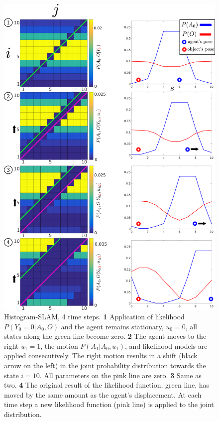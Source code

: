 \begin{figure}
 \centering
  \includegraphics[width=\textwidth]{./ch5-MLMF/Figures/explenation/hist_motion.pdf}
  \caption{Histogram-SLAM, 4 time steps. \textbf{1} Application of likelihood $P(Y_0=0|A_0,O)$ and the agent remains stationary, $u_0=0$, all states along the green line become zero.
  \textbf{2} The agent moves to the right $u_1=1$, the motion $P(A_1|A_0,u_1)$, and likelihood models are applied consecutively. The right motion results in a shift (black arrow on the left) in the joint probability 
  distribution towards the state $i=10$. All parameters on the pink line are zero. \textbf{3} Same as two. \textbf{4} The original result of the likelihood function,
  green line, has moved by the same amount as the agent's displacement. At each time step a new likelihood function (pink line) is applied to the joint distribution.}
  \label{fig:discrete_example}
\end{figure}

